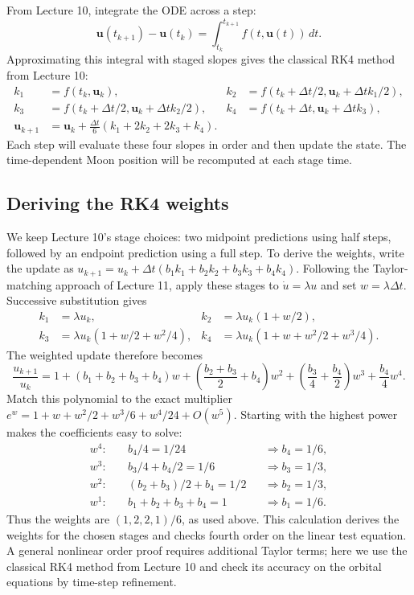 \documentclass[11pt]{article}
\newcommand{\dt}{\Delta t}
\newcommand{\vect}[1]{\boldsymbol{#1}}
\begin{document}
From Lecture 10, integrate the ODE across a step:
\[
\vect u(t_{k+1})-\vect u(t_k)=\int_{t_k}^{t_{k+1}} f(t,\vect u(t))\,dt.
\]
Approximating this integral with staged slopes gives the classical RK4 method from Lecture 10:
\begin{align*}
 k_1&=f(t_k,\vect u_k),&
 k_2&=f(t_k+\dt/2,\vect u_k+\dt k_1/2),\\
 k_3&=f(t_k+\dt/2,\vect u_k+\dt k_2/2),&
 k_4&=f(t_k+\dt,\vect u_k+\dt k_3),\\
 \vect u_{k+1}&=\vect u_k+\frac{\dt}{6}(k_1+2k_2+2k_3+k_4).
\end{align*}
Each step will evaluate these four slopes in order and then update the state. The time-dependent Moon position will be recomputed at each stage time.

\subsection*{Deriving the RK4 weights}
We keep Lecture 10's stage choices: two midpoint predictions using half steps,
followed by an endpoint prediction using a full step. To derive the weights,
write the update as $u_{k+1}=u_k+\dt(b_1k_1+b_2k_2+b_3k_3+b_4k_4)$.
Following the Taylor-matching approach of Lecture 11, apply these stages to
$\dot u=\lambda u$ and set $w=\lambda\dt$. Successive substitution gives
\[
\begin{aligned}
 k_1&=\lambda u_k, & k_2&=\lambda u_k(1+w/2),\\
 k_3&=\lambda u_k(1+w/2+w^2/4), &
 k_4&=\lambda u_k(1+w+w^2/2+w^3/4).
\end{aligned}
\]
The weighted update therefore becomes
\[
\frac{u_{k+1}}{u_k}
=1+(b_1+b_2+b_3+b_4)w
+\left(\frac{b_2+b_3}{2}+b_4\right)w^2
+\left(\frac{b_3}{4}+\frac{b_4}{2}\right)w^3
+\frac{b_4}{4}w^4.
\]
Match this polynomial to the exact multiplier
$e^w=1+w+w^2/2+w^3/6+w^4/24+O(w^5)$.
Starting with the highest power makes the coefficients easy to solve:
\begin{align*}
 w^4:&\quad b_4/4=1/24 &&\Longrightarrow b_4=1/6,\\
 w^3:&\quad b_3/4+b_4/2=1/6 &&\Longrightarrow b_3=1/3,\\
 w^2:&\quad (b_2+b_3)/2+b_4=1/2 &&\Longrightarrow b_2=1/3,\\
 w^1:&\quad b_1+b_2+b_3+b_4=1 &&\Longrightarrow b_1=1/6.
\end{align*}
Thus the weights are $(1,2,2,1)/6$, as used above. This calculation derives
the weights for the chosen stages and checks fourth order on the linear
test equation. A general nonlinear order proof requires additional Taylor
terms; here we use the classical RK4 method from Lecture 10 and check its
accuracy on the orbital equations by time-step refinement.
\end{document}
